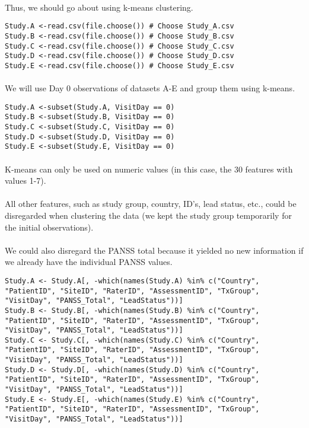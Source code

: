 \documentclass{article}
\begin{document}
\paragraph{}Thus, we should go about using k-means clustering.
\begin{lstlisting}
Study.A <-read.csv(file.choose()) # Choose Study_A.csv
Study.B <-read.csv(file.choose()) # Choose Study_B.csv
Study.C <-read.csv(file.choose()) # Choose Study_C.csv
Study.D <-read.csv(file.choose()) # Choose Study_D.csv
Study.E <-read.csv(file.choose()) # Choose Study_E.csv
\end{lstlisting}

 \paragraph{}We will use Day 0 observations of datasets A-E and group them using k-means.
\begin{lstlisting}
Study.A <-subset(Study.A, VisitDay == 0)
Study.B <-subset(Study.B, VisitDay == 0)
Study.C <-subset(Study.C, VisitDay == 0)
Study.D <-subset(Study.D, VisitDay == 0)
Study.E <-subset(Study.E, VisitDay == 0)
\end{lstlisting}	
	\paragraph{}K-means can only be used on numeric values (in this case, the 30 features with values 1-7).
\paragraph{}All other features, such as study group, country, ID’s, lead status, etc., could be disregarded when clustering the data (we kept the study group temporarily for the initial observations).
\paragraph{}We could also disregard the PANSS total because it yielded no new information if we already have the individual PANSS values.
\begin{lstlisting}
Study.A <- Study.A[, -which(names(Study.A) %in% c("Country", "PatientID", "SiteID", "RaterID", "AssessmentID", "TxGroup", "VisitDay", "PANSS_Total", "LeadStatus"))]
Study.B <- Study.B[, -which(names(Study.B) %in% c("Country", "PatientID", "SiteID", "RaterID", "AssessmentID", "TxGroup", "VisitDay", "PANSS_Total", "LeadStatus"))]
Study.C <- Study.C[, -which(names(Study.C) %in% c("Country", "PatientID", "SiteID", "RaterID", "AssessmentID", "TxGroup", "VisitDay", "PANSS_Total", "LeadStatus"))]
Study.D <- Study.D[, -which(names(Study.D) %in% c("Country", "PatientID", "SiteID", "RaterID", "AssessmentID", "TxGroup", "VisitDay", "PANSS_Total", "LeadStatus"))]
Study.E <- Study.E[, -which(names(Study.E) %in% c("Country", "PatientID", "SiteID", "RaterID", "AssessmentID", "TxGroup", "VisitDay", "PANSS_Total", "LeadStatus"))]
\end{lstlisting}
\end{document}
